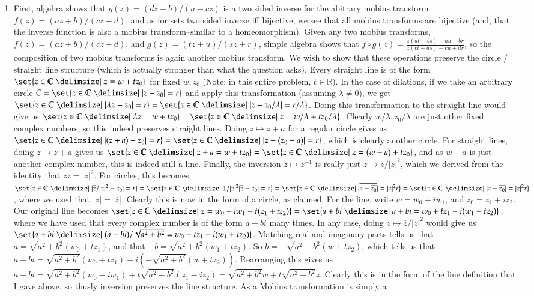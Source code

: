 \documentclass[12pt]{article}
\def\mbb#1{\mathbb{#1}}
\def \C{\mbb{C}}
\def \R{\mbb{R}}
\theoremstyle{definition}
\theoremstyle{remark}
\begin{document}
\begin{enumerate}[leftmargin=\labelsep]
		\item First, algebra shows that $g(z) = (dz-b)/(a-cz)$ is a two sided inverse for the abitrary mobius transform $f(z) = (az+b)/(cz+d)$, and as for sets two sided inverse iff bijective, we see that all mobius transforms are bijective (and, that the inverse function is also a mobius transform--similar to a homeomorphism). Given any two mobius transforms, $f(z) = (az+b)/(cz+d)$, and $g(z) = (tz+u)/(sz+r)$, simple algebra shows that $f \circ g(z) = \frac{z(at+bs)+au+br}{z(ct+ds)+cu+dr}$, so the composition of two mobius transforms is again another mobius transform. We wish to show that these operations preserve the circle / straight line structure (which is actually stronger than what the question asks). Every straight line is of the form $\set{z \in \C \given z = w + tz_0}$ for fixed $w, z_0$ (Note: in this entire problem, $t \in \R$). In the case of dilations, if we take an arbitrary circle $C = \set{z \in \C \given |z - z_0| = r}$ and apply this transformation (assuming $\lambda \neq 0$), we get $\set{z \in \C \given |\lambda z - z_0| = r} = \set{z \in \C \given |z-z_0/\lambda| = r/\lambda}$. Doing this transformation to the straight line would give us $\set{z \in \C \given \lambda z = w + tz_0} = \set{z \in \C \given z = w/\lambda + tz_0/\lambda}$. Clearly $w/\lambda, z_0/\lambda$ are just other fixed complex numbers, so this indeed preserves straight lines. Doing $z \mapsto z + a$ for a regular circle gives us $\set{z \in \C \given |(z+a) - z_0| = r} = \set{z \in \C \given |z-(z_0-a)| = r}$, which is clearly another circle. For straight lines, doing $z \to z + a$ gives us $\set{z \in \C \given z + a = w + tz_0} = \set{z \in \C \given z = (w-a) + tz_0}$, and as $w-a$ is just another complex number, this is indeed still a line. Finally, the inversion $z \mapsto z^{-1}$ is really just $z \to \overline{z}/|z|^2$, which we derived from the identity that $z \overline{z} = |z|^2$. For circles, this becomes $\set{z \in \C \given |\overline{z}/|z|^2 - z_0| = r} = \set{z \in \C \given 1/|z|^2 |\overline{z} - z_0| = r} = \set{z \in \C \given |\overline{z-\overline{z_0}}| = |z|^2r} = \set{z \in \C \given |z-\overline{z_0}| = |z|^2r}$, where we used that $|z| = |\overline{z}|$. Clearly this is now in the form of a circle, as claimed. For the line, write $w = w_0 + iw_1$, and $z_0 = z_1 + i z_2$. Our original line becomes $\set{z \in \C \given z = w_0 + iw_1 + t(z_1 + iz_2)} = \set{a + bi \given a + bi = w_0 + tz_1 + i(w_1 + tz_2)}$, where we have used that every complex number is of the form $a+bi$ many times. In any case, doing $z \mapsto \overline{z}/|z|^2$ would give us $\set{a+bi \given (a-bi)/\sqrt{a^2+b^2} = w_0 + tz_1 + i(w_1+tz_2)}$. Matching real and imaginary parts tells us that $a=\sqrt{a^2+b^2}(w_0+tz_1)$, and that $-b = \sqrt{a^2+b^2}(w_1+tz_2)$. So $b = -\sqrt{a^2+b^2}(w+tz_2)$, which tells us that $a+bi = \sqrt{a^2+b^2}(w_0+tz_1) + i(-\sqrt{a^2+b^2}(w+tz_2))$. Rearranging this gives us $a+bi = \sqrt{a^2+b^2}(w_0-iw_1) + t\sqrt{a^2+b^2}(z_1 - iz_2) = \sqrt{a^2+b^2}\overline{w} + t\sqrt{a^2+b^2}\overline{z}$. Clearly this is in the form of the line definition that I gave above, so thusly inversion preserves the line structure. As a Mobius transformation is simply a 
\end{enumerate}
\end{document}
